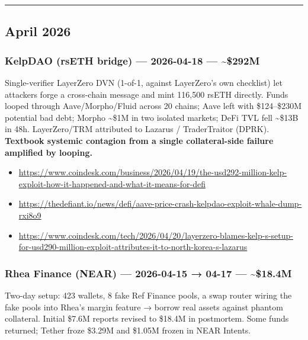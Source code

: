 \begin{center}\rule{0.5\linewidth}{0.5pt}\end{center}

\subsection{April 2026}\label{april-2026}

\subsubsection{KelpDAO (rsETH bridge) --- 2026-04-18 --- \textasciitilde\$292M}\label{kelpdao-rseth-bridge-2026-04-18-292m}

Single-verifier LayerZero DVN (1-of-1, against LayerZero's own checklist) let attackers forge a cross-chain message and mint 116,500 rsETH directly. Funds looped through Aave/Morpho/Fluid across 20 chains; Aave left with \$124--\$230M potential bad debt; Morpho \textasciitilde\$1M in two isolated markets; DeFi TVL fell \textasciitilde\$13B in 48h. LayerZero/TRM attributed to Lazarus / TraderTraitor (DPRK). \textbf{Textbook systemic contagion from a single collateral-side failure amplified by looping.}

\begin{itemize}
\tightlist
\item
  \url{https://www.coindesk.com/business/2026/04/19/the-usd292-million-kelp-exploit-how-it-happened-and-what-it-means-for-defi}
\item
  \url{https://thedefiant.io/news/defi/aave-price-crash-kelpdao-exploit-whale-dump-rxi8o9}
\item
  \url{https://www.coindesk.com/tech/2026/04/20/layerzero-blames-kelp-s-setup-for-usd290-million-exploit-attributes-it-to-north-korea-s-lazarus}
\end{itemize}

\subsubsection{Rhea Finance (NEAR) --- 2026-04-15 → 04-17 --- \textasciitilde\$18.4M}\label{rhea-finance-near-2026-04-15-04-17-18.4m}

Two-day setup: 423 wallets, 8 fake Ref Finance pools, a swap router wiring the fake pools into Rhea's margin feature → borrow real assets against phantom collateral. Initial \$7.6M reports revised to \$18.4M in postmortem. Some funds returned; Tether froze \$3.29M and \$1.05M frozen in NEAR Intents.

